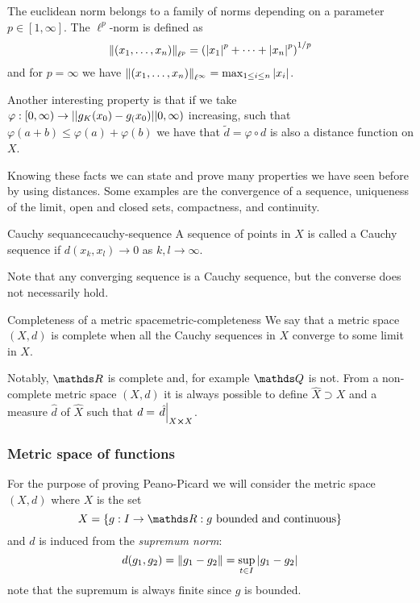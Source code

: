 \documentclass[12pt]{extarticle}
\begin{document}
The euclidean norm belongs to a family of norms depending on a parameter $p \in [1, \infty]$.
The $\ell^p$-norm is defined as
\begin{equation}
    \norm{(x_1, \dots, x_n)}_{\ell^p} = \left( \abs{x_1}^p + \dots + \abs{x_n}^p \right)^{1/p}
\end{equation}
and for $p = \infty$ we have $\norm{(x_1, \dots, x_n)}_{\ell^\infty} = \max_{1 \leq i \leq n} \abs{x_i}$.

Another interesting property is that if we take $\varphi : [0, \infty) \to\abs{}g_K(x_0) - g_(x_0)\abs{}0, \infty)$ increasing,
such that $\varphi(a + b) \leq \varphi(a) + \varphi(b)$ we have that $\tilde d = \varphi \circ d$
is also a distance function on $X$.

Knowing these facts we can state and prove many properties we have seen before by using distances.
Some examples are the convergence of a sequence, uniqueness of the limit, open and closed sets,
compactness, and continuity.

\begin{definition}{Cauchy sequance}{cauchy-sequence}
    A sequence of points in $X$ is called a Cauchy sequence if $d(x_k, x_l) \to 0$ as $k, l \to \infty$.
\end{definition}

Note that any converging sequence is a Cauchy sequence, but the converse does not necessarily hold.

\begin{definition}{Completeness of a metric space}{metric-completeness}
    We say that a metric space $(X, d)$ is complete when all the Cauchy sequences
    in $X$ converge to some limit in $X$.
\end{definition}

Notably, $\R$ is complete and, for example $\Q$ is not.
From a non-complete metric space $(X, d)$ it is always possible to define $\hat X \supset X$ and
a measure $\hat d$ of $\hat X$ such that $d = \eval{\hat d}_{X \cross X}$.

\subsubsection{Metric space of functions}
\label{sec:metric-space-func}

For the purpose of proving Peano-Picard we will consider the metric space $(X, d)$ where $X$ is the set
\begin{equation}
    X = \{ g:I \to \R : g \text{ bounded and continuous} \}
\end{equation}
and $d$ is induced from the \emph{supremum norm}:
\begin{equation}
    d(g_1, g_2) = \norm{g_1 - g_2} = \sup_{t \in I} \abs{g_1 - g_2}
\end{equation}
note that the supremum is always finite since $g$ is bounded.
\end{document}
